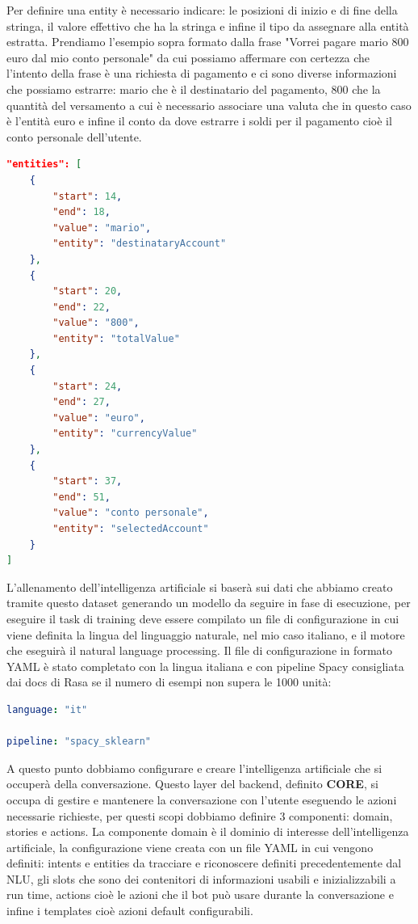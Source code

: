 Per definire una entity è necessario indicare: le posizioni di inizio e di fine della stringa, il valore effettivo che ha la stringa e infine il tipo da assegnare alla entità estratta.
Prendiamo l'esempio sopra formato dalla frase "Vorrei pagare mario 800 euro dal mio conto personale" da cui possiamo affermare con certezza che l'intento della frase è una richiesta di pagamento e ci sono diverse informazioni che possiamo estrarre: mario che è il destinatario del pagamento, 800 che la quantità del versamento a cui è necessario associare una valuta che in questo caso è l'entità euro e infine il conto da dove estrarre i soldi per il pagamento cioè il conto personale dell'utente.
\begin{lstlisting}[language=json,firstnumber=1]
"entities": [
    {
        "start": 14,
        "end": 18,
        "value": "mario",
        "entity": "destinataryAccount"
    },
    {
        "start": 20,
        "end": 22,
        "value": "800",
        "entity": "totalValue"
    },
    {
        "start": 24,
        "end": 27,
        "value": "euro",
        "entity": "currencyValue"
    },
    {
        "start": 37,
        "end": 51,
        "value": "conto personale",
        "entity": "selectedAccount"
    }
]
\end{lstlisting}
L'allenamento dell'intelligenza artificiale si baserà sui dati che abbiamo creato tramite questo dataset generando un modello da seguire in fase di esecuzione, per eseguire il task di training deve essere compilato un file di configurazione in cui viene definita la lingua del linguaggio naturale, nel mio caso italiano, e il motore che eseguirà il natural language processing.
Il file di configurazione in formato YAML è stato completato con la lingua italiana e con pipeline Spacy consigliata dai docs di Rasa se il numero di esempi non supera le 1000 unità:
\begin{lstlisting}[language=yaml]
language: "it"

pipeline: "spacy_sklearn"
\end{lstlisting}
A questo punto dobbiamo configurare e creare l'intelligenza artificiale che si occuperà della conversazione.
Questo layer del backend, definito \textbf{CORE}, si occupa di gestire e mantenere la conversazione con l'utente eseguendo le azioni necessarie richieste, per questi scopi dobbiamo definire 3 componenti: domain, stories e actions.
La componente domain è il dominio di interesse dell'intelligenza artificiale, la configurazione viene creata con un file YAML in cui vengono definiti: intents e entities da tracciare e riconoscere definiti precedentemente dal NLU, gli slots che sono dei contenitori di informazioni usabili e inizializzabili a run time, actions cioè le azioni che il bot può usare durante la conversazione e infine i templates cioè azioni default configurabili.
